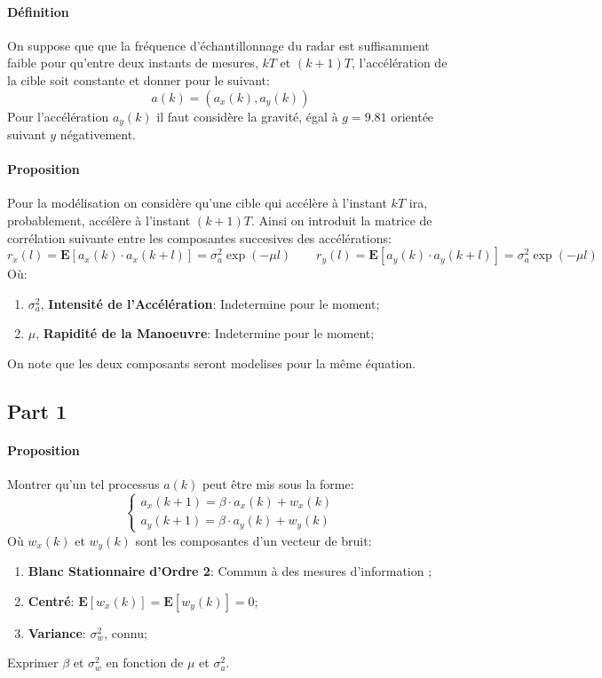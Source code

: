 \documentclass{article}
\begin{document}
\paragraph{Définition}On suppose que que la fréquence d'échantillonnage du radar est suffisamment faible pour qu'entre deux instants de mesures, $kT$ et $(k+1)T$, l'accélération de la cible soit constante et donner pour le suivant: $$a(k) = (a_{x}(k), a_{y}(k))$$Pour l'accélération $a_{y}(k)$ il faut considère la gravité, égal à $g = 9.81$ orientée suivant $y$ négativement.

\paragraph{Proposition}Pour la modélisation on considère qu'une cible qui accélère à l'instant $kT$ ira, probablement, accélère à l'instant $(k+1)T$. Ainsi on introduit la matrice de corrélation \cite{jacobianCovariance} suivante entre les composantes succesives des accélérations:
\begin{equation}
    r_{x} (l) = \mathbf{E}[a_{x}(k) \cdot a_{x}(k+l)] = \sigma_{a}^{2} \exp{(-\mu l)}
    \qquad
    r_{y} (l) = \mathbf{E}[a_{y}(k) \cdot a_{y}(k+l)] = \sigma_{a}^{2} \exp{(-\mu l)}
\end{equation}
\noindent Où:
\begin{enumerate}[noitemsep]
    \item $\sigma_{a}^{2}$, \textbf{Intensité de l'Accélération}: Indetermine pour le moment;
    \item $\mu$, \textbf{Rapidité de la Manoeuvre}: Indetermine pour le moment;
\end{enumerate}
On note que les deux composants seront modelises pour la même équation.


\subsection{Part 1}
\paragraph{Proposition}Montrer qu'un tel processus $a(k)$ peut être mis sous la forme:
\begin{equation*}
    \begin{cases}
        a_{x}(k+1) = \beta \cdot a_{x}(k) + w_{x}(k)\\
        a_{y}(k+1) = \beta \cdot a_{y}(k) + w_{y}(k)
    \end{cases}
\end{equation*}
Où $w_{x}(k)$ et $w_{y}(k)$ \cite{secondOrderProcess} sont les composantes d'un vecteur de bruit:
\begin{enumerate}[noitemsep]
    \item \textbf{Blanc Stationnaire d'Ordre 2}: Commun à des mesures d'information \cite{secondOrderProcessEquation};
    \item \textbf{Centré}: $\mathbf{E}[w_{x}(k)] = \mathbf{E}[w_{y}(k)] = 0$;
    \item \textbf{Variance}: $\sigma_{w}^2$, connu;
\end{enumerate}
Exprimer $\beta$ et $\sigma_{w}^2$ en fonction de $\mu$ et $\sigma_{a}^2$.
\end{document}
